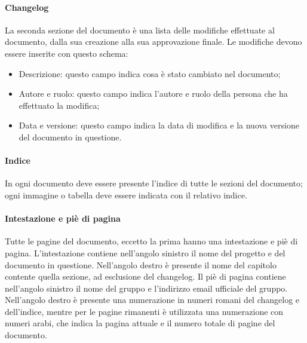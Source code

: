 		\paragraph{Changelog}
		La seconda sezione del documento è una lista delle modifiche effettuate al documento, dalla sua creazione alla sua approvazione finale. Le modifiche devono essere inserite con questo schema:
				\begin{itemize}
				\item{Descrizione}: questo campo indica cosa è stato cambiato nel documento;
				\item{Autore e ruolo}: questo campo indica l’autore e ruolo della persona che ha effettuato la modifica;
				\item{Data e versione}: questo campo indica la data di modifica e la nuova versione del documento in questione.
			\end{itemize}	
		\paragraph{Indice}
			In ogni documento deve essere presente l’indice di tutte le sezioni del documento; ogni immagine o tabella deve essere indicata con il relativo indice.
		\paragraph{Intestazione e piè di pagina}
			Tutte le pagine del documento, eccetto la prima hanno una intestazione e piè di pagina. L’intestazione contiene nell’angolo sinistro il nome del progetto e del documento in questione. Nell’angolo destro è presente il nome del capitolo contente quella sezione, ad esclusione del changelog.
			Il piè di pagina contiene nell’angolo sinistro il nome del gruppo e l’indirizzo email ufficiale del gruppo. Nell’angolo destro è presente una numerazione in numeri romani del changelog e dell’indice, mentre per le pagine rimanenti è utilizzata una numerazione con numeri arabi, che indica la pagina attuale e il numero totale di pagine del documento.
